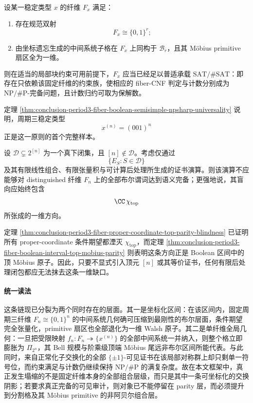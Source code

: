 \begin{conjecture}[布尔刚性纤维的普适复杂度承载]\label{conj:conclusion-boolean-rigid-fiber-universal-complexity}
设某一稳定类型 \(x\) 的纤维 \(F_x\) 满足：
\begin{enumerate}
  \item 存在规范双射
  \[
  F_x\cong \{0,1\}^r;
  \]
  \item 由坐标遗忘生成的中间系统子格在 \(F_x\) 上同构于 \(\mathcal B_r\)，且其 Möbius primitive 扇区全为一维。
\end{enumerate}
则在适当的局部块约束可用前提下，\(F_x\) 应当已经足以普适承载 \(\mathrm{SAT}/\#\mathrm{SAT}\)：即存在只依赖该固定纤维的约束族，使相应的 fiber-CNF 判定与计数分别成为 \(\mathrm{NP}/\#\mathrm P\)-完备问题，且计数归约可取为保解数。

定理 \ref{thm:conclusion-period3-fiber-boolean-semisimple-npsharp-universality} 说明，周期三稳定类型
\[
x^{(n)}=(001)^n
\]
正是这一原则的首个完整样本。
\end{conjecture}

\begin{conjecture}\label{conj:conclusion-period3-fiber-proper-downset-not-semantically-complete}
设 \(\mathcal D\subsetneq 2^{[n]}\) 为一个真下闭集，且 \([n]\notin\mathcal D\)。考虑仅通过
\[
\{E_S:S\in\mathcal D\}
\]
及其有限线性组合、有限张量积与可计算后处理所生成的证书演算。则该演算不应能够对 distinguished 纤维 \(F_n\) 上的全部布尔谓词达到语义完备；更强地说，其盲向应始终包含
\[
\CC\,\chi_{\mathrm{top}}
\]
所张成的一维方向。

定理 \ref{thm:conclusion-period3-fiber-proper-coordinate-top-parity-blindness} 已证明所有 proper-coordinate 条件期望都湮灭 \(\chi_{\mathrm{top}}\)，而定理 \ref{thm:conclusion-period3-fiber-boolean-interval-top-mobius-parity} 则表明这条方向正是 Boolean 区间中的顶 Möbius 原子。因此，只要不显式引入顶元 \([n]\) 或其等价证书，任何有限后处理闭包都应无法抹去这条一维缺口。
\end{conjecture}

\paragraph{统一读法}
这条链现已分裂为两个同时存在的层面。其一是坐标化区间：在该区间内，固定周期三纤维 \(F_n\cong\{0,1\}^n\) 的中间系统几何确可压缩到最刚性的布尔层面，条件期望完全张量化，primitive 扇区也全部退化为一维 Walsh 原子。其二是单纤维全局几何：一旦把受限映射 \(f_n:F_n\twoheadrightarrow\{x^{(n)}\}\) 的全部中间系统一并纳入，则整个格立即膨胀为 \(\Pi_{2^n}\)，其 Bell 规模与阶乘级顶端 Möbius 尾远非布尔区间所能代表。与此同时，来自正常化子交换化的全部 \(\{\pm1\}\)-可见证书在该局部对称群上却只剩单一符号位，而约束满足与计数仍继续保持 \(\mathrm{NP}/\#\mathrm P\) 的满复杂度。故在本文框架中，真正发生塌缩的不是固定纤维本身的全部组合层级，而只是其中一条可坐标化的交换阴影；若要求真正完备的可见审计，则对象已不能停留在 parity 层，而必须提升到分割格及其 Möbius primitive 的非阿贝尔组合层。

\endinput
